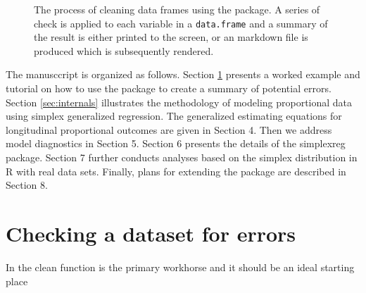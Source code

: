 \documentclass[article]{jss}
\begin{document}
\begin{figure}
\begin{center}
\end{center}
\label{fig:flowchart1}
\caption{The process of cleaning data frames using the 
  package. A series of check is applied to each variable in a
  \texttt{data.frame} and a summary of the result is either printed to
  the screen, or an  markdown file is produced which is
  subsequently rendered.}
\end{figure}


The manusccript is organized as follows. Section \ref{sec:example1}
presents a worked example and tutorial on how to use the 
package to create a summary of potential errors. Section
\ref{sec:internals} illustrates the methodology of modeling
proportional data using simplex generalized regression. The
generalized estimating equations for longitudinal proportional
outcomes are given in Section 4. Then we address model diagnostics in
Section 5. Section 6 presents the details of the simplexreg
package. Section 7 further conducts analyses based on the simplex
distribution in R with real data sets. Finally, plans for extending
the package are described in Section 8.




\section{Checking a dataset for errors} \label{sec:example1}

In  the clean function is the primary workhorse and it
should be an ideal starting place
\end{document}
